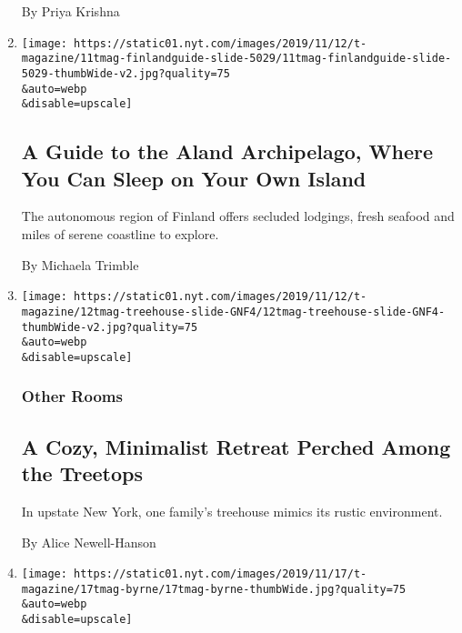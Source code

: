 \begin{enumerate}
  By Priya Krishna
\item
  \href{/2019/11/12/t-magazine/aland-islands-travel-guide.html}{}

  \texttt{[image: https://static01.nyt.com/images/2019/11/12/t-magazine/11tmag-finlandguide-slide-5029/11tmag-finlandguide-slide-5029-thumbWide-v2.jpg?quality=75\\\&auto=webp\\\&disable=upscale]}

  \hypertarget{a-guide-to-the-aland-archipelago-where-you-can-sleep-on-your-own-island}{%
  \subsection{A Guide to the Aland Archipelago, Where You Can Sleep on
  Your Own
  Island}\label{a-guide-to-the-aland-archipelago-where-you-can-sleep-on-your-own-island}}

  The autonomous region of Finland offers secluded lodgings, fresh
  seafood and miles of serene coastline to explore.

  By Michaela Trimble
\item
  \href{/2019/11/11/t-magazine/willow-treehouse.html}{}

  \texttt{[image: https://static01.nyt.com/images/2019/11/12/t-magazine/12tmag-treehouse-slide-GNF4/12tmag-treehouse-slide-GNF4-thumbWide-v2.jpg?quality=75\\\&auto=webp\\\&disable=upscale]}

  \hypertarget{other-rooms}{%
  \subsubsection{Other Rooms}\label{other-rooms}}

  \hypertarget{a-cozy-minimalist-retreat-perched-among-the-treetops}{%
  \subsection{A Cozy, Minimalist Retreat Perched Among the
  Treetops}\label{a-cozy-minimalist-retreat-perched-among-the-treetops}}

  In upstate New York, one family's treehouse mimics its rustic
  environment.

  By Alice Newell-Hanson
\item
  \href{/2019/11/11/t-magazine/david-byrne-binder.html}{}

  \texttt{[image: https://static01.nyt.com/images/2019/11/17/t-magazine/17tmag-byrne/17tmag-byrne-thumbWide.jpg?quality=75\\\&auto=webp\\\&disable=upscale]}

  \hypertarget{admiration-society}{%
}
\end{enumerate}
